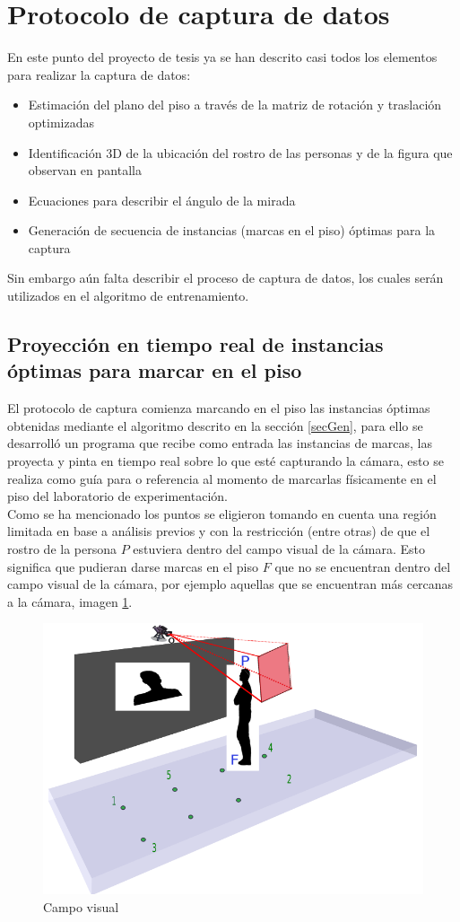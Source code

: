 \section{Protocolo de captura de datos}
En este punto del proyecto de tesis ya se han descrito casi todos los elementos para realizar la captura de datos:
\begin{itemize}
	\item Estimación del plano del piso a través de la matriz de rotación y traslación optimizadas
	\item Identificación 3D de la ubicación del rostro de las personas y de la figura que observan en pantalla
	\item Ecuaciones para describir el ángulo de la mirada
	\item Generación de secuencia de instancias (marcas en el piso) óptimas para la captura
\end{itemize}
Sin embargo aún falta describir el proceso de captura de datos, los cuales serán utilizados en el algoritmo de entrenamiento. 
\subsection{Proyección en tiempo real de instancias óptimas para marcar en el piso}
El protocolo de captura comienza marcando en el piso las instancias óptimas obtenidas mediante el algoritmo descrito en la sección \ref{secGen}, para ello se desarrolló un programa que recibe como entrada las instancias de marcas, las proyecta y pinta en tiempo real sobre lo que esté capturando la cámara, esto se realiza como guía para o referencia al momento de marcarlas físicamente en el piso del laboratorio de experimentación.\\

Como se ha mencionado los puntos se eligieron tomando en cuenta una región limitada en base a análisis previos y con la restricción (entre otras) de que el rostro de la persona $P$ estuviera dentro del campo visual de la cámara. Esto significa que pudieran darse marcas en el piso $F$ que no se encuentran dentro del campo visual de la cámara, por ejemplo aquellas que se encuentran más cercanas a la cámara, imagen \ref{fig: figVisualFieldIm}.
	\begin{figure}[htbp]
		\centering
		\includegraphics[width=.47\textwidth]{./pictures/visualFieldIm}
		\caption{Campo visual}\label{fig: figVisualFieldIm}
	\end{figure}

